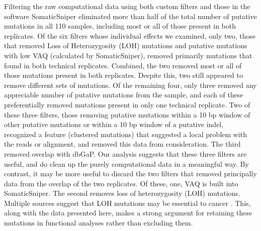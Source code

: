 \documentclass[11pt]{article} %
\begin{document}
Filtering the raw computational data using both custom filters and those in the software SomaticSniper eliminated more than half of the total number of putative mutations in all 110 samples, including most or all of those present in both replicates.  Of the six filters whose individual effects we examined, only two, those that removed Loss of Heterozygosity (LOH) mutations and putative mutations with low VAQ (calculated by SomaticSniper), removed primarily mutations that found in both technical replicates. Combined, the two removed most or all of those mutations present in both replicates. Despite this, two still appeared to remove different sets of mutations. Of the remaining four, only three removed any appreciable number of putative mutations from the sample, and each of these preferentially removed mutations present in only one technical replicate. Two of these three filters, those removing putative mutations within a 10 bp window of other putative mutations or within a 10 bp window of a putative indel, recognized a feature (clustered mutations) that suggested a local problem with the reads or alignment, and removed this data from consideration. The third removed overlap with dbGaP.  Our analysis suggests that these three filters are useful, and do clean up the purely computational data in a meaningful way. By contrast, it may be more useful to discard the two filters that removed principally data from the overlap of the two replicates. Of these, one, VAQ is built into SomaticSniper. The second removes loss of heterozygosity (LOH) mutations. Multiple sources suggest that LOH mutations may be essential to cancer \citep{LOH}. This, along with the data presented here, makes a strong argument for retaining these mutations in functional analyses rather than excluding them.
\end{document}
